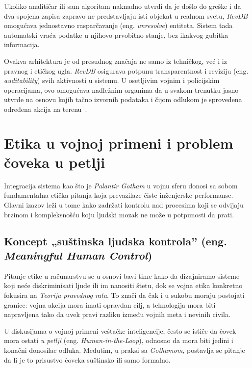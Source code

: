 ﻿\documentclass[12pt]{article}
\begin{document}
Ukoliko analitičar ili sam algoritam naknadno utvrdi da je došlo do greške i da dva spojena zapisa zapravo ne predstavljaju isti objekat u realnom svetu, \textit{RevDB} omogućava jednostavno rasparčavanje (eng. \textit{unresolve}) entiteta.
Sistem tada automatski vraća podatke u njihovo prvobitno stanje, bez ikakvog gubitka informacija.

Ovakva arhitektura je od presudnog značaja ne samo iz tehničkog, već i iz pravnog i etičkog ugla.
\textit{RevDB} osigurava potpunu transparentnost i reviziju (eng. \textit{auditability}) svih aktivnosti u sistemu.
U osetljivim vojnim i policijskim operacijama, ovo omogućava nadležnim organima da u svakom trenutku jasno utvrde na osnovu kojih tačno izvornih podataka i čijom odlukom je sprovedena određena akcija na terenu~\cite{architecture2024, palantir2024privacy}.

\section{Etika u vojnoj primeni i problem čoveka u petlji}

Integracija sistema kao što je \textit{Palantir Gotham} u vojnu sferu donosi sa sobom fundamentalna etička pitanja koja prevazilaze čiste inženjerske performanse.
Glavni izazov leži u tome kako zadržati kontrolu nad procesima koji se odvijaju brzinom i kompleksnošću koju ljudski mozak ne može u potpunosti da prati.

\subsection{Koncept „suštinska ljudska kontrola” (eng. \textit{Meaningful Human Control})}

Pitanje etike u računarstvu se u osnovi bavi time kako da dizajniramo sisteme koji neće diskriminisati ljude ili im nanositi štetu, dok se vojna etika konkretno fokusira na \textit{Teoriju pravednog rata}. To znači da čak i u sukobu moraju postojati granice: vojna akcija mora imati opravdan cilj, a tehnologija mora biti napravljena tako da uvek pravi razliku između vojnih meta i nevinih civila.

U diskusijama o vojnoj primeni veštačke inteligencije, često se ističe da čovek mora ostati \textit{u petlji} (eng. \textit{Human-in-the-Loop}), odnosno da mora biti jedini i konačni donosilac odluka.
Međutim, u praksi sa \textit{Gothamom}, postavlja se pitanje da li je to prisustvo čoveka suštinsko ili samo formalno.
\end{document}
